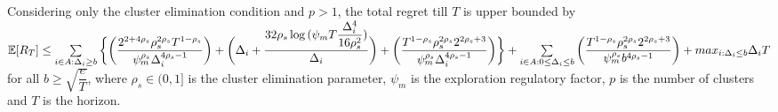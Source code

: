 \begin{proposition}
Considering only the cluster elimination condition and $p>1$, the total regret till $T$ is upper bounded by $\mathbb{E} [R_{T}]\leq \sum\limits_{i\in A:\Delta_{i}\geq b}\bigg\lbrace \bigg(\dfrac{2^{2+4\rho_{s}}\rho_{s}^{2\rho_{s}}T^{1-\rho_{s}}}{\psi_{m}^{\rho_{s}}\Delta_{i}^{4\rho_{s}-1}}\bigg) + \bigg(\Delta_{i}+\dfrac{32\rho_{s}\log{(\psi_{m}T\dfrac{\Delta_{i}^{4}}{16\rho_{s}^{2}})}}{\Delta_{i}}\bigg)  +  \bigg(\dfrac{T^{1-\rho_{s}}\rho_{s}^{2\rho_{s}}2^{2\rho_{s}+3}}{\psi_{m}^{\rho_{s}}\Delta_{i}^{4\rho_{s} -1}} \bigg)\bigg \rbrace +\sum\limits_{i\in A:0\leq\Delta_{i}\leq b}\bigg(\dfrac{T^{1-\rho_{s}}\rho_{s}^{2\rho_{s}}2^{2\rho_{s}+3}}{\psi_{m}^{\rho_{s}}b^{4\rho_{s} -1}} \bigg) + max_{i:\Delta_{i}\leq b}\Delta_{i}T$ for all $b\geq \sqrt{\dfrac{e}{T}}$, where $\rho_{s}\in (0,1]$ is the cluster elimination parameter, $\psi_{m}$ is the exploration regulatory factor, $p$ is the number of clusters and $T$ is the horizon.
\end{proposition}


